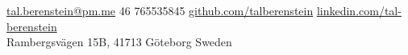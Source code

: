 \documentclass[10pt,a4paper]{article}
\begin{document}
\sloppy  %



\nobreakvspace{0.3em}  %

\noindent\href{mailto:tal.berenstein@pm.me}{tal.berenstein\mbox{}@\mbox{}pm.me}\sbull
\textsmaller{+}46 765535845\sbull
\href{https://github.com/talberenstein}{github.com/talberenstein}\sbull
\href{https://linkedin.com/in/tali-berenstein-torres-94055726b/}{linkedin.com/tal-berenstein}
\\
Rambergsvägen 15B,
41713\thinspace {\large \sc }\sbull
Göteborg\sbull
Sweden

\spacedhrule{0.9em}{-0.4em}  %

\end{document}

